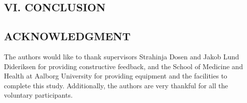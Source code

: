 \begin{multicols}{2}
	
	\subsection*{VI. CONCLUSION}%
	
%	
	
	
	
	\subsection*{ACKNOWLEDGMENT}
	
	The authors would like to thank supervisors Strahinja Dosen and Jakob Lund Dideriksen for providing constructive feedback, and the School of Medicine and Health at Aalborg University for providing equipment and the facilities to complete this study. Additionally, the authors are very thankful for all the voluntary participants. 


\renewcommand*{\bibfont}{\small}
	\printbibliography
	

	
	
\end{multicols}


